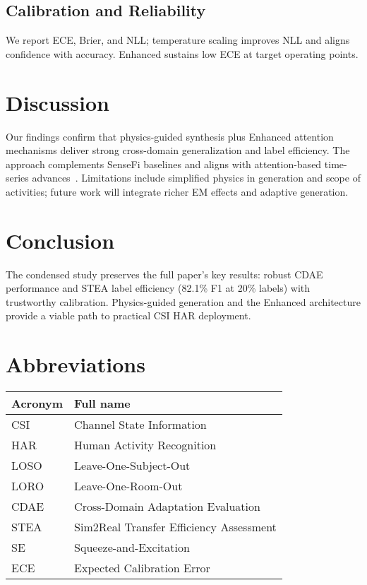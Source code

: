 \documentclass[journal]{IEEEtran}
\begin{document}
\subsection{Calibration and Reliability}
We report ECE, Brier, and NLL; temperature scaling improves NLL and aligns confidence with accuracy. Enhanced sustains low ECE at target operating points.

\section{Discussion}
Our findings confirm that physics-guided synthesis plus Enhanced attention mechanisms deliver strong cross-domain generalization and label efficiency. The approach complements SenseFi baselines and aligns with attention-based time-series advances~\cite{li2020tea,bertasius2021timesformer,lim2021tft,zhou2021informer}. Limitations include simplified physics in generation and scope of activities; future work will integrate richer EM effects and adaptive generation.

\section{Conclusion}
The condensed study preserves the full paper's key results: robust CDAE performance and STEA label efficiency (82.1\% F1 at 20\% labels) with trustworthy calibration. Physics-guided generation and the Enhanced architecture provide a viable path to practical CSI HAR deployment.

\section*{Abbreviations}
\begin{table}[h]
\centering
\begin{tabular}{@{}ll@{}}
\toprule
\textbf{Acronym} & \textbf{Full name} \\
\midrule
CSI & Channel State Information \\
HAR & Human Activity Recognition \\
LOSO & Leave-One-Subject-Out \\
LORO & Leave-One-Room-Out \\
CDAE & Cross-Domain Adaptation Evaluation \\
STEA & Sim2Real Transfer Efficiency Assessment \\
SE & Squeeze-and-Excitation \\
ECE & Expected Calibration Error \\
\bottomrule
\end{tabular}
\end{table}



\end{document}
